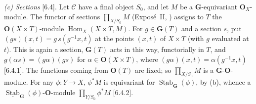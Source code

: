 \par\smallskip\noindent\textit{(c) Sections} [6.4].
Let \(\mathscr C\) have a final object \(S_0\), and let \(M\) be a
\(\mathbf G\)-equivariant \(\mathbf O_X\)-module. The functor of sections
\(\prod_{X/S_0}M\) (Exposé~II, ) assigns to \(T\) the
\(\mathbf O(X\times T)\)-module \(\operatorname{Hom}_X(X\times T,M)\). For
\(g\in\mathbf G(T)\) and a section \(s\), put \((gs)(x,t)=g\,s(g^{-1}x,t)\)
at the points \((x,t)\) of \(X\times T\) (with \(g\) evaluated at \(t\)).
This is again a section, \(\mathbf G(T)\) acts in this way, functorially in
\(T\), and \(g(\alpha s)=(g\alpha)(gs)\) for
\(\alpha\in\mathbf O(X\times T)\), where \((g\alpha)(x,t)=\alpha(g^{-1}x,t)\)
[6.4.1]. The functions coming from \(\mathbf O(T)\) are fixed; so
\(\prod_{X/S_0}M\) is a \(\mathbf G\)-\(\mathbf O\)-module. For any
\(\phi:Y\to X\), \(\phi^*M\) is equivariant for
\(\underline{\operatorname{Stab}}_{\mathbf G}(\phi)\), by (b), whence a
\(\underline{\operatorname{Stab}}_{\mathbf G}(\phi)\)-\(\mathbf O\)-module
\(\prod_{Y/S_0}\phi^*M\) [6.4.2].

